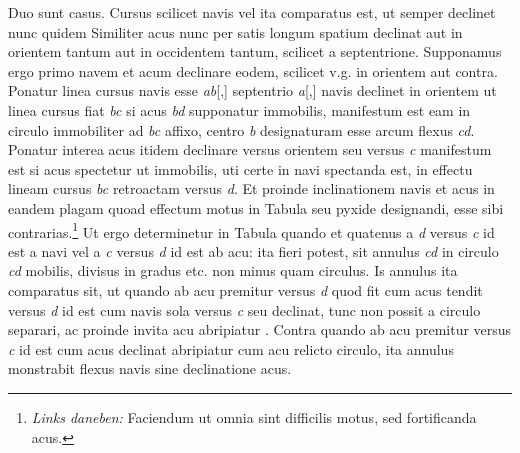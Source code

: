       \pstart Duo sunt casus. Cursus scilicet navis\protect{} vel ita comparatus est, ut semper declinet nunc quidem  Similiter acus\protect{} nunc per satis longum spatium declinat aut in orientem tantum aut in occidentem tantum, scilicet a septentrione. Supponamus ergo primo navem\protect{} et acum\protect{} declinare eodem, scilicet  v.g. in orientem aut contra. Ponatur linea cursus navis\protect{} esse \textit{ab}[,] septentrio \textit{a}[,] navis\protect{} declinet in orientem ut linea cursus fiat \textit{bc} si acus\protect{} \textit{bd} supponatur immobilis, manifestum est eam in circulo immobiliter ad \textit{bc} affixo, centro \textit{b} designaturam esse arcum flexus \textit{cd}. Ponatur interea acus\protect{} itidem declinare versus orientem seu versus \textit{c} manifestum est si acus\protect{} spectetur ut immobilis, uti certe in navi\protect{} spectanda est, in effectu lineam cursus \textit{bc} retroactam versus \textit{d}. Et proinde inclinationem\protect{} navis\protect{} et acus\protect{} in eandem plagam quoad effectum motus in Tabula seu pyxide\protect{} designandi, esse sibi contrarias.\footnote{\textit{Links daneben:} Faciendum ut omnia sint difficilis motus, sed fortificanda acus\protect{}. } Ut ergo determinetur in Tabula quando et quatenus  a \textit{d} versus \textit{c} id est a navi\protect{} vel a \textit{c} versus \textit{d} id est ab acu\protect{}: ita fieri potest, sit annulus \textit{cd} in circulo \textit{cd} mobilis, divisus in gradus etc. non minus quam circulus. Is annulus ita comparatus sit, ut quando ab acu\protect{} premitur versus \textit{d} quod fit cum acus\protect{} tendit versus \textit{d} id est cum navis\protect{} sola versus \textit{c} seu declinat, tunc non possit a circulo separari, ac proinde invita acu\protect{} abripiatur . Contra quando ab acu\protect{} premitur versus \textit{c} id est cum acus \protect{} declinat abripiatur cum acu\protect{} relicto circulo, ita annulus monstrabit flexus navis\protect{} sine declinatione\protect{} acus\protect{}.